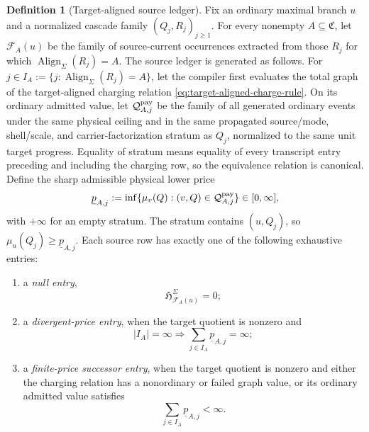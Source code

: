 \documentclass[11pt]{article}
\numberwithin{section}{part}
\theoremstyle{plain}
\theoremstyle{definition}
\newtheorem{definition}[definition]{Definition}
\theoremstyle{remark}
\newcommand{\Channels}{\mathfrak C}
\newcommand{\Align}{\operatorname{Align}}
\begin{document}
\begin{definition}[Target-aligned source ledger]
\label{def:target-aligned-source-ledger}
Fix an ordinary maximal branch \(u\) and a normalized cascade family
\((Q_j,R_j)_{j\ge1}\).  For every nonempty \(A\subseteq\Channels\), let
\(\mathcal F_A(u)\) be the family of source-current occurrences extracted
from those \(R_j\) for which \(\Align_\Sigma(R_j)=A\).  The source ledger is
generated as follows.  For \(j\in I_A:=\{j:\Align_\Sigma(R_j)=A\}\), let
the compiler first evaluates the total graph of the target-aligned charging
relation \eqref{eq:target-aligned-charge-rule}.  On its ordinary admitted
value, let \(\mathcal Q_{A,j}^{\rm pay}\) be the family of all generated
ordinary events under the same physical ceiling and in the same propagated
source/mode, shell/scale, and carrier-factorization stratum as \(Q_j\),
normalized to the same unit target progress.  Equality of stratum means
equality of every transcript entry preceding and including the charging row,
so the equivalence relation is canonical.  Define the sharp admissible
physical lower price
\begin{equation}
 \label{eq:canonical-source-price-schedule}
 \underline p_{A,j}
 :=\inf\{\mu_v(Q): (v,Q)\in\mathcal Q_{A,j}^{\rm pay}\}\in[0,\infty],
\end{equation}
with \(+\infty\) for an empty stratum.  The stratum contains \((u,Q_j)\), so
\(\mu_u(Q_j)\ge\underline p_{A,j}\).  Each source row has exactly one of the
following exhaustive entries:
\begin{enumerate}[label=\textup{(L\arabic*)}]
\item a \emph{null entry},
  \begin{equation}
   \label{eq:source-ledger-null-entry}
   \mathfrak H_{\mathcal F_A(u)}^\Sigma=0;
  \end{equation}
\item a \emph{divergent-price entry}, when the target quotient is nonzero and
  \begin{equation}
   \label{eq:source-ledger-divergent-entry}
   |I_A|=\infty\Longrightarrow
   \sum_{j\in I_A}\underline p_{A,j}=\infty;
  \end{equation}
\item a \emph{finite-price successor entry}, when the target quotient is
nonzero and either the charging relation has a nonordinary or failed graph
value, or its ordinary admitted value satisfies
  \begin{equation}
   \label{eq:source-ledger-formation-entry}
   \sum_{j\in I_A}\underline p_{A,j}<\infty.

\end{equation}
\end{enumerate}
\end{definition}
\end{document}
